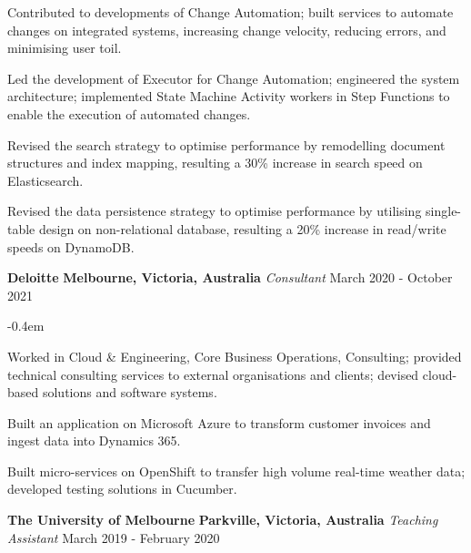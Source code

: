 \documentclass{cv}
\begin{document}
\begin{list}{}{\setlength{\leftmargin}{0em}}
\begin{list}{\raisebox{0.2em}{\tiny$\bullet$} \hspace{0em}}{\setlength{\leftmargin}{1.2em}}
        \item Contributed to developments of Change Automation; built services to automate changes on integrated systems, increasing change velocity, reducing errors, and minimising user toil.
        \item Led the development of Executor for Change Automation; engineered the system architecture; implemented State Machine Activity workers in Step Functions to enable the execution of automated changes.
        \item Revised the search strategy to optimise performance by remodelling document structures and index mapping, resulting a 30\% increase in search speed on Elasticsearch.
        \item Revised the data persistence strategy to optimise performance by utilising single-table design on non-relational database, resulting a 20\% increase in read/write speeds on DynamoDB.
    \end{list}
\item
    \textbf{Deloitte} \hfill \textbf{Melbourne, Victoria, Australia}%
    \vspace{0.1em} \newline 
    {\textit{Consultant}} \hfill {March 2020 - October 2021}%
    \begin{list}{\raisebox{0.2em}{\tiny$\bullet$} \hspace{0em}}{\setlength{\leftmargin}{1.2em}}
        \itemsep -0.4em \vspace{-0.4em}
        \item Worked in Cloud \& Engineering, Core Business Operations, Consulting; provided technical consulting services to external organisations and clients; devised cloud-based solutions and software systems.
        \item Built an application on Microsoft Azure to transform customer invoices and ingest data into Dynamics 365.
        \item Built micro-services on OpenShift to transfer high volume real-time weather data; developed testing solutions in Cucumber.
    \end{list}
\item
    \textbf{The University of Melbourne} \hfill \textbf{Parkville, Victoria, Australia}%
    \vspace{0.1em} \newline 
    {\textit{Teaching Assistant}} \hfill {March 2019 - February 2020}%
    \begin{list}{\raisebox{0.2em}{\tiny$\bullet$} \hspace{0em}}{\setlength{\leftmargin}{1.2em}}

\end{list}
\end{list}
\end{document}
